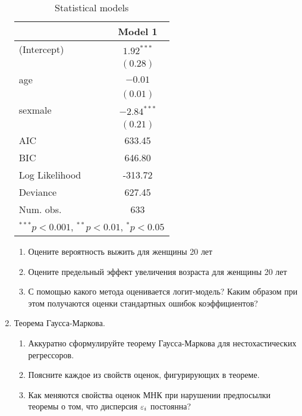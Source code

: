 \documentclass[12pt, a4paper]{article}
\theoremstyle{definition}
\begin{document}
\begin{enumerate}
\begin{table}[h!]
\begin{center}
\begin{tabular}{l c }
\hline
 & Model 1 \\
\hline
(Intercept)    & $1.92^{***}$  \\
               & $(0.28)$      \\
age            & $-0.01$       \\
               & $(0.01)$      \\
sexmale        & $-2.84^{***}$ \\
               & $(0.21)$      \\
\hline
AIC            & 633.45        \\
BIC            & 646.80        \\
Log Likelihood & -313.72       \\
Deviance       & 627.45        \\
Num. obs.      & 633           \\
\hline
\multicolumn{2}{l}{\scriptsize{$^{***}p<0.001$, $^{**}p<0.01$, $^*p<0.05$}}
\end{tabular}
\caption{Statistical models}
\label{table:titanic-2}
\end{center}
\end{table}



\begin{enumerate}
\item Оцените вероятность выжить для женщины 20 лет
\item Оцените предельный эффект увеличения возраста для женщины 20 лет
\item С помощью какого метода оценивается логит-модель? Каким образом при этом получаются оценки стандартных ошибок коэффициентов?
\end{enumerate}


\item Теорема Гаусса-Маркова.

\begin{enumerate}
\item Аккуратно сформулируйте теорему Гаусса-Маркова для нестохастических регрессоров.
\item Поясните каждое из свойств оценок, фигурирующих в теореме.
\item Как меняются свойства оценок МНК при нарушении предпосылки теоремы о том, что дисперсия $\varepsilon_i$ постоянна?
\end{enumerate}


\end{enumerate}
\end{document}
